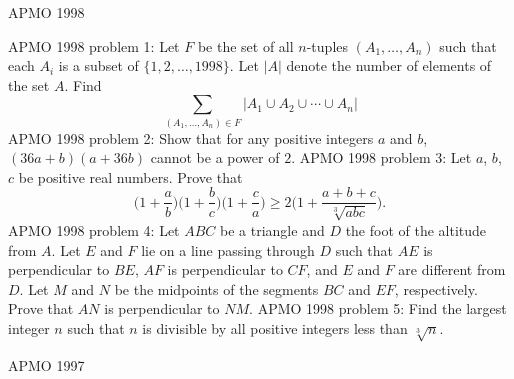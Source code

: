 APMO 1998 

APMO 1998 problem 1:  Let $F$ be the set of all $n$-tuples $(A_1, \ldots, A_n)$ such that each $A_i$ is a subset of $\{1, 2, \ldots, 1998\}$.  Let $|A|$ denote the number of elements of the set $A$.  Find
\[ \sum_{(A_1, \ldots, A_n)\in F} |A_1\cup A_2\cup \cdots \cup A_n| \] 
APMO 1998 problem 2:  Show that for any positive integers $a$ and $b$, $(36a+b)(a+36b)$ cannot be a power of $2$. 
APMO 1998 problem 3:  Let $a$, $b$, $c$ be positive real numbers.  Prove that
\[
\biggl(1+\frac{a}{b}\biggr) \biggl(1+\frac{b}{c}\biggr) \biggl(1+\frac{c}{a}\biggr) \ge 2 \biggl(1+\frac{a+b+c}{\sqrt[3]{abc}}\biggr).
\] 
APMO 1998 problem 4:  Let $ABC$ be a triangle and $D$ the foot of the altitude from $A$. Let $E$ and $F$ lie on a line passing through $D$ such that $AE$ is perpendicular to $BE$, $AF$ is perpendicular to $CF$, and $E$ and $F$ are different from $D$. Let $M$ and $N$ be the midpoints of the segments $BC$ and $EF$, respectively. Prove that $AN$ is perpendicular to $NM$. 
APMO 1998 problem 5:  Find the largest integer $n$ such that $n$ is divisible by all positive integers less than $\sqrt[3]{n}$. 

APMO 1997 

